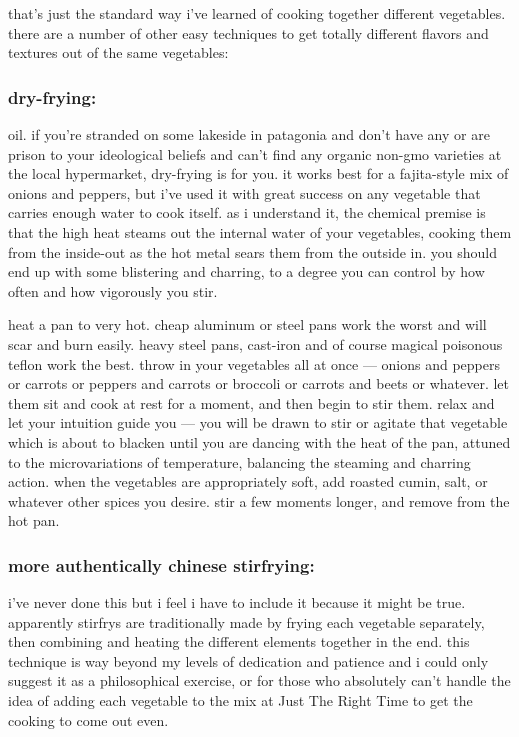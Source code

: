 that's just the standard way i've learned of cooking together different 
vegetables. there are a number of other easy techniques to get totally 
different flavors and textures out of the same vegetables:

\subsubsection{dry-frying:}

oil. if you're stranded on some lakeside in patagonia and don't have any or 
are prison to your ideological beliefs and can't find any organic non-gmo 
varieties at the local hypermarket, dry-frying is for you. it works best for a 
fajita-style mix of onions and peppers, but i've used it with great success on 
any vegetable that carries enough water to cook itself. as i understand it, 
the chemical premise is that the high heat steams out the internal water of 
your vegetables, cooking them from the inside-out as the hot metal sears them 
from the outside in. you should end up with some blistering and charring, to a 
degree you can control by how often and how vigorously you stir. 

heat a pan to very hot. cheap aluminum or steel pans work the worst and will 
scar and burn easily. heavy steel pans, cast-iron and of course magical 
poisonous teflon work the best. throw in your vegetables all at once --- 
onions and peppers or carrots or peppers and carrots or broccoli or carrots 
and beets or whatever. let them sit and cook at rest for a moment, and then 
begin to stir them. relax and let your intuition guide you --- you will be 
drawn to stir or agitate that vegetable which is about to blacken until you 
are dancing with the heat of the pan, attuned to the microvariations of 
temperature, balancing the steaming and charring action. when the vegetables 
are appropriately soft, add roasted cumin, salt, or whatever other spices 
you desire. stir a few moments longer, and remove from the hot pan.

\subsubsection{more authentically chinese stirfrying:}

i've never done this but i feel i have to include it because it might be true. 
apparently stirfrys are traditionally made by frying each vegetable 
separately, then combining and heating the different elements together in the 
end. this technique is way beyond my levels of dedication and patience and i 
could only suggest it as a philosophical exercise, or for those who absolutely 
can't handle the idea of adding each vegetable to the mix at Just The Right 
Time to get the cooking to come out even.

